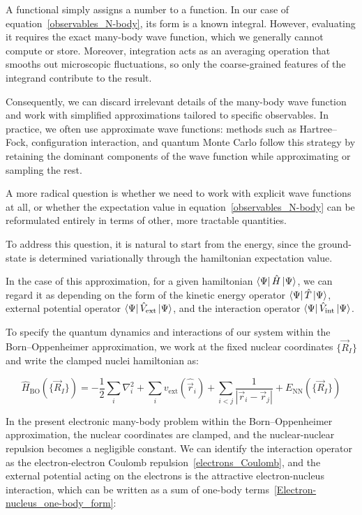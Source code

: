 A functional simply assigns a number to a function. In our case of equation~\eqref{observables_N-body}, its form is a known integral. However, evaluating it requires the exact many-body wave function, which we generally cannot compute or store. Moreover, integration acts as an averaging operation that smooths out microscopic fluctuations, so only the coarse-grained features of the integrand contribute to the result.

Consequently, we can discard irrelevant details of the many-body wave function and work with simplified approximations tailored to specific observables.
In practice, we often use approximate wave functions: methods such as Hartree--Fock, configuration interaction, and quantum Monte Carlo follow this strategy by retaining the dominant components of the wave function while approximating or sampling the rest.

A more radical question is whether we need to work with explicit wave functions at all, or whether the expectation value in equation~\eqref{observables_N-body} can be reformulated entirely in terms of other, more tractable quantities.

To address this question, it is natural to start from the energy, since the ground-state is determined variationally through the hamiltonian expectation value.

In the case of this approximation, for a given hamiltonian $\bra{\Psi}\hat{H}\ket{\Psi}$, we can regard it as depending on the form of the kinetic energy operator $\bra{\Psi}\hat{T}\ket{\Psi}$, external potential operator $\bra{\Psi}\hat{V}_\mathrm{ext}\ket{\Psi}$, and the interaction operator $\bra{\Psi}\hat{V}_\mathrm{int}\ket{\Psi}$.

To specify the quantum dynamics and interactions of our system within the Born--Oppenheimer approximation,
we work at the fixed nuclear coordinates $\{\vec{R}_I\}$ and write the clamped nuclei hamiltonian as:

\begin{equation}
    \hat{H}_\mathrm{BO}(\{\vec{R}_I\})
    = -\frac{1}{2}\sum_i\nabla_i^2
    + \sum_i v_{\mathrm{ext}}(\hat{\vec{r}}_i)
    + \sum_{i<j}\frac{1}{|\vec{r}_i - \vec{r}_j|}
    + E_\mathrm{NN}(\{\vec{R}_I\})
\label{BO_hamiltonian}
\end{equation}

In the present electronic many-body problem within the Born--Oppenheimer approximation, 
the nuclear coordinates are clamped, and the nuclear-nuclear repulsion becomes a negligible constant. 
We can identify the interaction operator as the electron-electron Coulomb repulsion~\eqref{electrons_Coulomb},
and the external potential acting on the electrons is the attractive electron-nucleus interaction, which can be written as a sum of one-body terms~\eqref{Electron-nucleus_one-body_form}:

